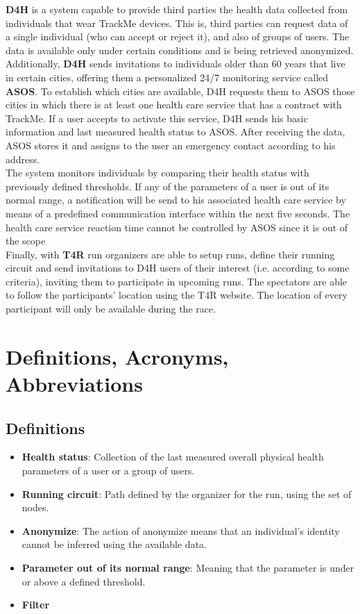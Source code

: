 \documentclass[a4paper, hidelinks, 12pt]{report}
\begin{document}
	\textbf{D4H} is a system capable to provide third parties the health data collected from individuals that wear TrackMe devices. This is, third parties can request data of a single individual (who can accept or reject it), and also of groups of users. The data is available only  under certain conditions and is being retrieved anonymized.\\
	
	Additionally, \textbf{D4H} sends invitations to individuals older than 60 years that live in certain cities, offering them a personalized 24/7 monitoring service called \textbf{ASOS}. To establish which cities are available, D4H requests them to ASOS those cities in which there is at least one health care service that has a contract with TrackMe. If a user accepts to activate this service, D4H sends his basic information and last measured health status to ASOS. After receiving the data, ASOS stores it and assigns to the user an emergency contact according to his address. \\
			
	The system monitors individuals by comparing their health status with previously defined thresholds. If any of the parameters of a user is out of its normal range, a notification will be send to his associated health care service by means of a predefined communication
interface within the next five seconds. The health care service reaction time cannot be controlled by ASOS since it is out of the scope \\
	
	Finally, with \textbf{T4R} run organizers are able to setup runs, define their running circuit and send invitations to D4H users of their interest (i.e. according to some criteria), inviting them to participate in upcoming runs. The spectators are able to follow the participants' location using the T4R website. The location of every participant will only be available during the race.
	
	\section{Definitions, Acronyms, Abbreviations}
	\subsection{Definitions}
	\begin{itemize}
		\item{\textbf{Health status}}: Collection of the last measured overall physical health parameters of a user or a group of users.
		\item{\textbf{Running circuit}}: Path defined by the organizer for the run, using the set of nodes.
		\item{\textbf{Anonymize}}: The action of anonymize means that an individual’s identity cannot
be inferred using the available data.
		\item{\textbf{Parameter out of its normal range}}: Meaning that the parameter is under or above a defined threshold. 
		\item{\textbf{Filter}}
	\end{itemize}
	
\end{document}
